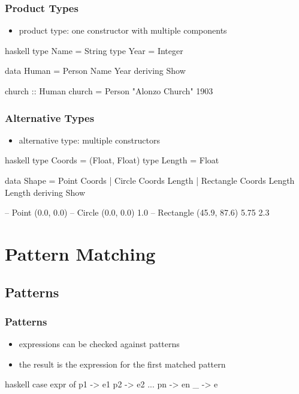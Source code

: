 \documentclass[dvipsnames]{beamer}
\theoremstyle{plain}
\begin{document}
\begin{frame}[fragile]
  \frametitle{Product Types}

  \begin{itemize}
    \item product type: one constructor with multiple components
  \end{itemize}

  \begin{exampleblock}{}
    \begin{pygments}{haskell}
type Name = String
type Year = Integer

data Human = Person Name Year
             deriving Show

church :: Human
church = Person "Alonzo Church" 1903
    \end{pygments}
  \end{exampleblock}
\end{frame}

\begin{frame}[fragile]
  \frametitle{Alternative Types}

  \begin{itemize}
    \item alternative type: multiple constructors
  \end{itemize}

  \begin{exampleblock}{}
    \begin{pygments}{haskell}
type Coords = (Float, Float)
type Length = Float

data Shape = Point Coords |
             Circle Coords Length |
             Rectangle Coords Length Length
             deriving Show

-- Point (0.0, 0.0)
-- Circle (0.0, 0.0) 1.0
-- Rectangle (45.9, 87.6) 5.75 2.3
    \end{pygments}
  \end{exampleblock}
\end{frame}

\section{Pattern Matching}

\subsection{Patterns}

\begin{frame}[fragile]
  \frametitle{Patterns}

  \begin{itemize}
    \item expressions can be checked against patterns
    \item the result is the expression for the first matched pattern
  \end{itemize}

  \begin{block}{}
    \begin{pygments}{haskell}
case expr of
  p1 -> e1
  p2 -> e2
  ...
  pn -> en
  _  -> e
    \end{pygments}
  \end{block}
\end{frame}
\end{document}
